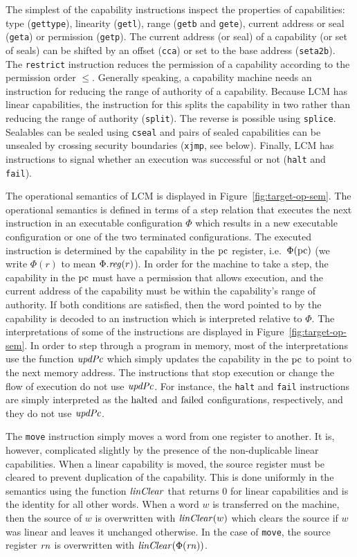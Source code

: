 \documentclass[acmsmall,screen]{acmart}\settopmatter{}
\renewcommand{\updPcAddr}[1]{\plainfun{updPc}{#1}}
\renewcommand{\linCons}[1]{\plainfun{linClear}{#1}}
\newcommand{\trgcm}{\textsc{LCM}}
\begin{document}
The simplest of the capability instructions inspect the properties of capabilities: type (\texttt{gettype}), linearity (\texttt{getl}), range (\texttt{getb} and \texttt{gete}), current address or seal (\texttt{geta}) or permission (\texttt{getp}).
The current address (or seal) of a capability (or set of seals) can be shifted by an offset (\texttt{cca}) or set to the base address (\texttt{seta2b}).
The \texttt{restrict} instruction reduces the permission of a capability according to the permission order $\le$.
Generally speaking, a capability machine needs an instruction for reducing the range of authority of a capability.
Because \trgcm{} has linear capabilities, the instruction for this splits the capability in two rather than reducing the range of authority (\texttt{split}).
The reverse is possible using \texttt{splice}.
Sealables can be sealed using \texttt{cseal} and pairs of sealed capabilities can be unsealed by crossing security boundaries (\texttt{xjmp}, see below).
Finally, \trgcm{} has instructions to signal whether an execution was successful or not (\texttt{halt} and \texttt{fail}).

The operational semantics of \trgcm{} is displayed in Figure~\ref{fig:target-op-sem}.
The operational semantics is defined in terms of a step relation that executes the next instruction in an executable configuration $\Phi$ which results in a new executable configuration or one of the two terminated configurations.
The executed instruction is determined by the capability in the $\mathrm{pc}$ register, i.e.\ $\Phi(\mathrm{pc})$ (we write $\Phi(r)$ to mean $\Phi.\reg(r)$).
In order for the machine to take a step, the capability in the $\mathrm{pc}$ must have a permission that allows execution, and the current address of the capability must be within the capability's range of authority.
If both conditions are satisfied, then the word pointed to by the capability is decoded to an instruction which is interpreted relative to $\Phi$.
The interpretations of some of the instructions are displayed in Figure~\ref{fig:target-op-sem}.
In order to step through a program in memory, most of the interpretations use the function $\updPcAddr{}$ which simply updates the capability in the $\mathrm{pc}$ to point to the next memory address.
The instructions that stop execution or change the flow of execution do not use $\updPcAddr{}$.
For instance, the \texttt{halt} and \texttt{fail} instructions are simply interpreted as the $\mathrm{halted}$ and $\mathrm{failed}$ configurations, respectively, and they do not use $\updPcAddr{}$.

The \texttt{move} instruction simply moves a word from one register to another.
It is, however, complicated slightly by the presence of the non-duplicable linear capabilities.
When a linear capability is moved, the source register must be cleared to prevent duplication of the capability.
This is done uniformly in the semantics using the function $\linCons{}$ that returns $0$ for linear capabilities and is the identity for all other words.
When a word $w$ is transferred on the machine, then the source of $w$ is overwritten with $\linCons{w}$ which clears the source if $w$ was linear and leaves it unchanged otherwise.
In the case of \texttt{move}, the source register $\mathit{rn}$ is overwritten with $\linCons{\Phi(\rn)}$.
\end{document}
